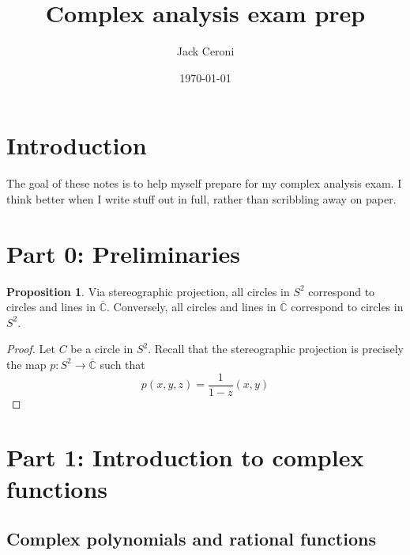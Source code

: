 \documentclass[aps,pra,showpacs,notitlepage,onecolumn,superscriptaddress,nofootinbib]{revtex4-1}
\theoremstyle{definition}
\newtheorem{proposition}{Proposition}[section]
\newcommand{\hhrulefill}{\hspace{-1.5em} \hrulefill}
\begin{document}
\title{Complex analysis exam prep}
\author{Jack Ceroni}

\date{\today}

\maketitle

\tableofcontents

\section{Introduction}

\noindent The goal of these notes is to help myself prepare for my complex analysis exam. I think better when I write stuff out in full, rather than scribbling away on paper.

\hhrulefill

\section{Part 0: Preliminaries}

\begin{proposition}
  Via stereographic projection, all circles in $S^2$ correspond to circles and lines in $\overline{\mathbb{C}}$. Conversely, all
  circles and lines in $\overline{\mathbb{C}}$ correspond to circles in $S^2$.
\end{proposition}

\begin{proof}
  Let $C$ be a circle in $S^2$. Recall that the stereographic projection is precisely the map $p : S^2 \rightarrow \overline{\mathbb{C}}$ such that
  \begin{equation}
    p(x, y, z) = \frac{1}{1 - z} (x, y)
  \end{equation}
  
  \end{proof}

\section{Part 1: Introduction to complex functions}

\subsection{Complex polynomials and rational functions}
\end{document}
